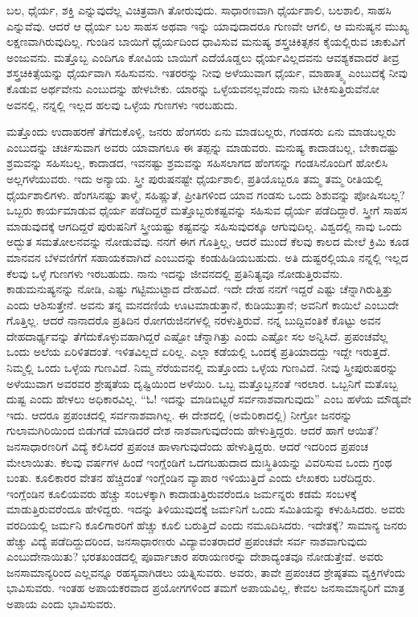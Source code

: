 ಬಲ, ಧೈರ್ಯ, ಶಕ್ತಿ ಎನ್ನುವುದೆಲ್ಲ ವಿಚಿತ್ರವಾಗಿ ತೋರುವುದು. ಸಾಧಾರಣವಾಗಿ ಧೈರ್ಯಶಾಲಿ, ಬಲಶಾಲಿ, ಸಾಹಸಿ ಎನ್ನುವೆವು. ಆದರೆ ಆ ಧೈರ್ಯ ಬಲ ಸಾಹಸ ಅಥವಾ ಇನ್ನು ಯಾವುದಾದರೂ ಗುಣವೇ ಆಗಲಿ, ಆ ಮನುಷ್ಯನ ಮುಖ್ಯ ಲಕ್ಷಣವಾಗಿರುವುದಿಲ್ಲ. ಗುಂಡಿನ ಬಾಯಿಗೆ ಧೈರ್ಯದಿಂದ ಧಾವಿಸುವ ಮನುಷ್ಯ ಶಸ್ತ್ರಚಿಕಿತ್ಸಕನ ಕೈಯಲ್ಲಿರುವ ಚಾಕುವಿಗೆ ಅಂಜುವನು. ಮತ್ತೊಬ್ಬ ಎಂದಿಗೂ ಕೋವಿಯ ಬಾಯಿಗೆ ಎದೆಯೊಡ್ಡಲು ಧೈರ್ಯವಿಲ್ಲದವನು ಆವಶ್ಯಕವಾದರೆ ತೀವ್ರ ಶಸ್ತ್ರಚಿಕಿತ್ಸೆಯನ್ನು ಧೈರ್ಯವಾಗಿ ಸಹಿಸುವನು. ಇತರರನ್ನು ನೀವು ಅಳೆಯುವಾಗ ಧೈರ್ಯ, ಮಾಹಾತ್ಮ್ಯ ಎಂಬುದಕ್ಕೆ ನೀವು ಕೊಡುವ ಅರ್ಥವೇನು ಎಂಬುದನ್ನು ಹೇಳಬೇಕು. ಯಾರನ್ನು ಒಳ್ಳೆಯವನಲ್ಲವೆಂದು ನಾನು ಟೀಕಿಸುತ್ತಿರುವೆನೋ ಅವನಲ್ಲಿ, ನನ್ನಲ್ಲಿ ಇಲ್ಲದ ಹಲವು ಒಳ್ಳೆಯ ಗುಣಗಳು ಇರಬಹುದು.

ಮತ್ತೊಂದು ಉದಾಹರಣೆ ತೆಗೆದುಕೊಳ್ಳಿ, ಜನರು ಹೆಂಗಸರು ಏನು ಮಾಡಬಲ್ಲರು, ಗಂಡಸರು ಏನು ಮಾಡಬಲ್ಲರು ಎಂಬುದನ್ನು ಚರ್ಚಿಸುವಾಗ ಅವರು ಯಾವಾಗಲೂ ಈ ತಪ್ಪನ್ನು ಮಾಡುವರು. ಮನುಷ್ಯ ಕಾದಾಡಬಲ್ಲ, ಬೇಕಾದಷ್ಟು ಶ್ರಮವನ್ನು ಸಹಿಸಬಲ್ಲ, ಕಾದಾಡದ, ಇವನಷ್ಟು ಶ್ರಮವನ್ನು ಸಹಿಸಲಾಗದ ಹೆಂಗಸನ್ನು ಗಂಡಸಿನೊಂದಿಗೆ ಹೋಲಿಸಿ ಅಲ್ಲಗಳೆಯುವರು. ಇದು ಅನ್ಯಾಯ. ಸ್ತ್ರೀ ಪುರುಷನಷ್ಟೇ ಧೈರ್ಯಶಾಲಿ, ಪ್ರತಿಯೊಬ್ಬರೂ ತಮ್ಮ ತಮ್ಮ ರೀತಿಯಲ್ಲಿ ಧೈರ್ಯಶಾಲಿಗಳು. ಹೆಂಗಸಿನಷ್ಟು ತಾಳ್ಮೆ, ಸಹಿಷ್ಣುತೆ, ಪ್ರೀತಿಗಳಿಂದ ಯಾವ ಗಂಡಸು ಒಂದು ಶಿಶುವನ್ನು ಪೋಷಿಸಬಲ್ಲ? ಒಬ್ಬರು ಕಾರ್ಯಮಾಡುವ ಧೈರ್ಯ ಪಡೆದಿದ್ದರೆ ಮತ್ತೊಬ್ಬರು\break ಕಷ್ಟವನ್ನು ಸಹಿಸುವ ಧೈರ್ಯ ಪಡೆದಿದ್ದಾರೆ. ಸ್ತ್ರೀಗೆ ಸಾಹಸ ಮಾಡುವುದಕ್ಕೆ ಆಗದಿದ್ದರೆ ಪುರುಷನಿಗೆ ಸ್ತ್ರೀಯಷ್ಟು ಕಷ್ಟವನ್ನು ಸಹಿಸುವುದಕ್ಕೂ ಆಗುವುದಿಲ್ಲ. ವಿಶ್ವದಲ್ಲಿ ನಾವು ಒಂದು ಅದ್ಭುತ ಸಮತೋಲನವನ್ನು ನೋಡುವೆವು. ನನಗೆ ಈಗ ಗೊತ್ತಿಲ್ಲ, ಆದರೆ ಮುಂದೆ ಕೆಲವು ಕಾಲದ ಮೇಲೆ ಕ್ರಿಮಿ ಕೂಡ ಮಾನವನ ಬೆಳವಣಿಗೆಗೆ ಸಹಾಯಕವಾಗಿದೆ ಎಂಬುದನ್ನು ಕಂಡುಹಿಡಿಯಬಹುದು. ಅತಿ ದುಷ್ಟರಲ್ಲಿಯೂ ನನ್ನಲ್ಲಿ ಇಲ್ಲದ ಕೆಲವು ಒಳ್ಳೆ ಗುಣಗಳು ಇರಬಹುದು. ನಾನು ಇದನ್ನು ಜೀವನದಲ್ಲಿ ಪ್ರತಿನಿತ್ಯವೂ ನೋಡುತ್ತಿರುವೆನು. ಕಾಡುಮನುಷ್ಯನನ್ನು ನೋಡಿ, ಎಷ್ಟು ಗಟ್ಟಿಮುಟ್ಟಾದ ದೇಹವಿದೆ. ಇದೇ ದೇಹ ನನಗೆ ಇದ್ದರೆ ಎಷ್ಟು ಚೆನ್ನಾಗಿರುತ್ತಿತ್ತು ಎಂದು ಆಶಿಸುತ್ತೇನೆ. ಅವನು ತನ್ನ ಮನದಣಿಯೆ ಊಟಮಾಡುತ್ತಾನೆ, ಕುಡಿಯುತ್ತಾನೆ; ಅವನಿಗೆ ಕಾಯಿಲೆ ಎಂಬುದೇ ಗೊತ್ತಿಲ್ಲ. ಆದರೆ ನಾನಾದರೊ ಪ್ರತಿದಿನ ರೋಗರುಜಿನಗಳಲ್ಲಿ ನರಳುತ್ತಿರುವೆ. ನನ್ನ ಬುದ್ದಿವಂತಿಕೆ ಕೊಟ್ಟು ಅವನ ದೇಹದಾರ್ಢ್ಯವನ್ನು ತೆಗೆದುಕೊಳ್ಳುವಹಾಗಿದ್ದರೆ ಎಷ್ಟೋ ಚೆನ್ನಾಗಿತ್ತು ಎಂದು ಎಷ್ಟೋ ಸಲ ಅನ್ನಿಸಿದೆ. ಪ್ರಪಂಚವೆಲ್ಲ ಒಂದು ಅಲೆಯ ಏರಿಳಿತದಂತೆ. ಇಳಿತವಿಲ್ಲದೆ ಏರಿಲ್ಲ. ಎಲ್ಲಾ ಕಡೆಯಲ್ಲಿ ಒಂದಕ್ಕೆ ಪ್ರತಿಯಾದದ್ದು ಇದ್ದೇ ಇರುತ್ತದೆ. ನಿಮ್ಮಲ್ಲಿ ಒಂದು ಒಳ್ಳೆಯ ಗುಣವಿದೆ. ನಿಮ್ಮ ನೆರೆಯವನಲ್ಲಿ ಮತ್ತೊಂದು ಒಳ್ಳೆಯ ಗುಣವಿದೆ. ನೀವು ಸ್ತ್ರೀಪುರುಷರನ್ನು ಅಳೆಯುವಾಗ ಅವರವರ ಶ್ರೇಷ್ಠತೆಯ ದೃಷ್ಟಿಯಿಂದ ಅಳೆಯಿರಿ. ಒಬ್ಬ ಮತ್ತೊಬ್ಬನಂತೆ ಇರಲಾರ. ಒಬ್ಬನಿಗೆ ಮತೊಬ್ಬ ದುಷ್ಟ ಎಂದು ಹೇಳಲು ಅಧಿಕಾರವಿಲ್ಲ. “ಓ! ಇದನ್ನು ಮಾಡಿಬಿಟ್ಟರೆ ಸರ್ವನಾಶವಾಗುವುದು'' ಎಂಬ ಹಳೆಯ ಮೌಡ್ಯವೇ ಇದು. ಆದರೂ ಪ್ರಪಂಚದಲ್ಲಿ ಸರ್ವನಾಶವಾಗಿಲ್ಲ. ಈ ದೇಶದಲ್ಲಿ (ಅಮೆರಿಕಾದಲ್ಲಿ) ನೀಗ್ರೋ ಜನರನ್ನು ಗುಲಾಮಗಿರಿಯಿಂದ ಬಿಡುಗಡೆ ಮಾಡಿದರೆ ದೇಶ ನಾಶವಾಗುವುದೆಂದು ಹೇಳುತ್ತಿದ್ದರು. ಆದರೆ ಹಾಗೆ ಆಯಿತೆ? ಜನಸಾಧಾರಣರಿಗೆ ವಿದ್ಯೆ ಕಲಿಸಿದರೆ ಪ್ರಪಂಚ ಹಾಳಾಗುವುದೆಂದು ಹೇಳುತ್ತಿದ್ದರು. ಆದರೆ ಇದರಿಂದ ಪ್ರಪಂಚ ಮೇಲಾಯಿತು. ಕೆಲವು ವರ್ಷಗಳ ಹಿಂದೆ ಇಂಗ್ಲೆಂಡಿಗೆ ಒದಗಬಹುದಾದ ದುಃಸ್ಥಿತಿಯನ್ನು ವಿವರಿಸುವ ಒಂದು ಗ್ರಂಥ ಬಂತು. ಕೂಲಿಕಾರರ ವೇತನ ಹೆಚ್ಚಿದಂತೆ ಇಂಗ್ಲೆಂಡಿನ ವ್ಯಾಪಾರ ಇಳಿಯುತ್ತಿದೆ ಎಂದು ಲೇಖಕರು ಬರೆದಿದ್ದರು. ಇಂಗ್ಲೆಂಡಿನ ಕೂಲಿಯವರು ಹೆಚ್ಚು ಸಂಬಳಕ್ಕಾಗಿ ಕಾದಾಡುತ್ತಿರುವರೆಂದೂ ಜರ್ಮನ್ನರು ಕಡಮೆ ಸಂಬಳಕ್ಕೆ ಮಾಡುತ್ತಿರುವರೆಂದೂ ಹೇಳಿದ್ದರು. ಇದನ್ನು ತಿಳಿಯುವುದಕ್ಕೆ ಜರ್ಮನಿಗೆ ಒಂದು ಸಮಿತಿಯನ್ನು ಕಳುಹಿಸಿದರು. ಅವರು ವರದಿಯಲ್ಲಿ ಜರ್ಮನಿ ಕೂಲಿಗಾರರಿಗೆ ಹೆಚ್ಚು ಕೂಲಿ ಬರುತ್ತಿದೆ ಎಂದು ನಮೂದಿಸಿದರು. ಇದೇತಕ್ಕೆ? ಸಾಮಾನ್ಯ ಜನರು ಹೆಚ್ಚು ವಿದ್ಯೆ ಪಡೆದಿದ್ದುದರಿಂದ, ಜನಸಾಧಾರಣರು ವಿದ್ಯಾವಂತರಾದರೆ ಪ್ರಪಂಚವೇ ಸರ್ವ ನಾಶವಾಗುವುದು ಎಂಬುದೇನಾಯಿತು? ಭರತಖಂಡದಲ್ಲಿ ಪೂರ್ವಾಚಾರ ಪರಾಯಣರನ್ನು ದೇಶಾದ್ಯಂತವೂ ನೋಡುತ್ತೇವೆ. ಅವರು ಜನಸಾಮಾನ್ಯರಿಂದ ಎಲ್ಲವನ್ನೂ ರಹಸ್ಯವಾಗಿಡಲು ಯತ್ನಿಸುವರು. ಅವರು, ತಾವೇ ಪ್ರಪಂಚದ ಶ್ರೇಷ್ಠತಮ ವ್ಯಕ್ತಿಗಳೆಂದು ಭಾವಿಸುವರು. ಇಂತಹ ಅಪಾಯಕರವಾದ ಪ್ರಯೋಗಗಳಿಂದ ತಮಗೆ ಅಪಾಯವಿಲ್ಲ, ಕೇವಲ ಜನಸಾಮಾನ್ಯರಿಗೆ ಮಾತ್ರ ಅಪಾಯ ಎಂದು ಭಾವಿಸುವರು.

